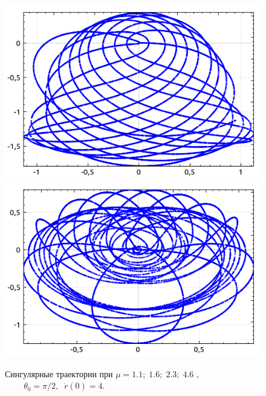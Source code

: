 \documentclass[12pt]{article}
\numberwithin{equation}{section}
\begin{document}
\begin{enumerate}
\begin{figure}[h]
{			\includegraphics[scale=0.55]{2.3_1.5708}
			\includegraphics[scale=0.55]{4.6_1.5708}
		}
		\caption{Сингулярные траектории при $ \mu=1.1;\;1.6;\;2.3;\;4.6 $ , $\;\;\;\;\;\;\;\; \theta_{0}=\pi/2, \;\; \dot r(0) = 4.$}
        \label{singular}
	\end{figure}
	\clearpage
	

\end{enumerate}
\end{document}
